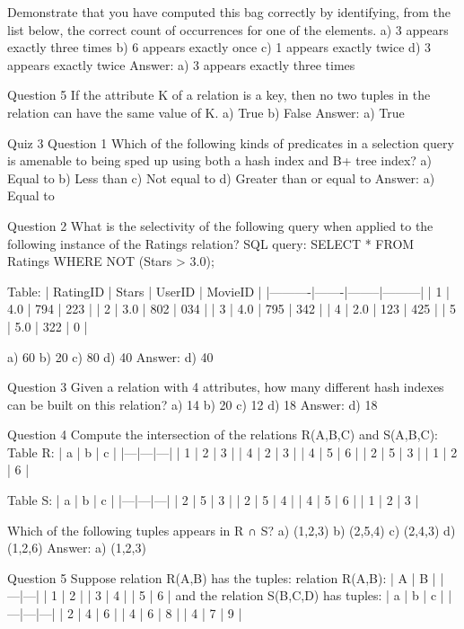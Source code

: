  Demonstrate that you have computed this bag correctly by identifying, from the list below, the correct count of occurrences for one of the elements.
  a) 3 appears exactly three times
  b) 6 appears exactly once
  c) 1 appears exactly twice
  d) 3 appears exactly twice
  Answer: a) 3 appears exactly three times

  Question 5
  If the attribute K of a relation is a key, then no two tuples in the relation can have the same value of K.
  a) True
  b) False
  Answer: a) True

Quiz 3
  Question 1
  Which of the following kinds of predicates in a selection query is amenable to being sped up using both a hash index and B+ tree index?
  a) Equal to
  b) Less than
  c) Not equal to
  d) Greater than or equal to
  Answer: a) Equal to

  Question 2 
  What is the selectivity of the following query when applied to the following instance of the Ratings relation?
  SQL query:
  SELECT * FROM Ratings WHERE NOT (Stars > 3.0);

  Table:
  | RatingID | Stars | UserID | MovieID |
  |----------|-------|--------|---------|
  | 1        | 4.0   | 794    | 223     |
  | 2        | 3.0   | 802    | 034     |
  | 3        | 4.0   | 795    | 342     |
  | 4        | 2.0   | 123    | 425     |
  | 5        | 5.0   | 322    | 0       |

  a) 60%
  b) 20%
  c) 80%
  d) 40%
  Answer: d) 40%

  Question 3
  Given a relation with 4 attributes, how many different hash indexes can be built on this relation?
  a) 14
  b) 20
  c) 12
  d) 18
  Answer: d) 18

  Question 4
  Compute the intersection of the relations R(A,B,C) and S(A,B,C):
  Table R:
    | a | b | c |
    |---|---|---|
    | 1 | 2 | 3 |
    | 4 | 2 | 3 |
    | 4 | 5 | 6 |
    | 2 | 5 | 3 |
    | 1 | 2 | 6 |

  Table S:
    | a | b | c |
    |---|---|---|
    | 2 | 5 | 3 |
    | 2 | 5 | 4 |
    | 4 | 5 | 6 |
    | 1 | 2 | 3 |
    
  Which of the following tuples appears in R ∩ S?
  a) (1,2,3)
  b) (2,5,4)
  c) (2,4,3)
  d) (1,2,6)
  Answer: a) (1,2,3)

  Question 5
  Suppose relation R(A,B) has the tuples:
  relation R(A,B):
    | A | B |
    |---|---|
    | 1 | 2 |
    | 3 | 4 |
    | 5 | 6 |
  and the relation S(B,C,D) has tuples:
    | a | b | c |
    |---|---|---|
    | 2 | 4 | 6 |
    | 4 | 6 | 8 |
    | 4 | 7 | 9 |
  
